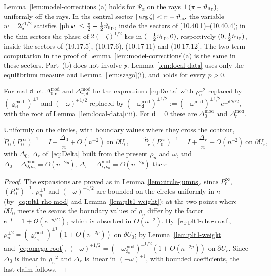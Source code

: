Lemma~\ref{lem:model-corrections}(a) holds for $\Psi_\alpha$ on the rays $\pm(\pi-\vartheta_{\mathrm{lip}})$, uniformly off the rays.
In the central sector $|\arg\zeta|<\pi-\vartheta_{\mathrm{lip}}$ the variable $w=2\zeta^{1/2}$ satisfies
$|\mathrm{ph}\,w|\le\frac\pi2-\frac12\vartheta_{\mathrm{lip}}$, inside the sectors of (10.40.1)--(10.40.4); in the thin sectors the phase of
$2(-\zeta)^{1/2}$ lies in $(-\frac12\vartheta_{\mathrm{lip}},0)$, respectively $(0,\frac12\vartheta_{\mathrm{lip}})$, inside the sectors of (10.17.5),
(10.17.6), (10.17.11) and (10.17.12). The two-term computation in the proof of Lemma~\ref{lem:model-corrections}(a) is
the same in these sectors. Part~(b) does not involve $p$. Lemma~\ref{lem:local-data} uses only the equilibrium measure
and Lemma~\ref{lem:szego}(i), and holds for every $p>0$.

For real $\mathsf d$ let $\Delta^{\mathrm{mod}}_{0,\mathsf d}$ and $\Delta^{\mathrm{mod}}_{r,\mathsf d}$ be the expressions
\eqref{eq:Delta} with $\rho_n^{\pm2}$ replaced by $(\varrho^{\mathrm{mod}}_{\mathsf d})^{\pm1}$ and $(-\omega)^{\pm1/2}$ replaced by
$(-\omega^{\mathrm{mod}}_{\mathsf d})^{\pm1/2}:=(-\omega^{\mathrm{mod}})^{\pm1/2}e^{\pm\mathsf d\mathcal R/2}$, with the root of
Lemma~\ref{lem:local-data}(iii). For $\mathsf d=0$ these are $\Delta^{\mathrm{mod}}_0$ and $\Delta^{\mathrm{mod}}_r$.

\begin{lemma}\label{lem:plt1-jumps}
Uniformly on the circles, with boundary values where they cross the contour,
\[
  \check P_0(P^\infty_0)^{-1}=I+\frac{\Delta_0}n+O(n^{-2})\ \text{on }\partial U_0,\qquad
  \hat P_r(P^\infty_0)^{-1}=I+\frac{\Delta_r}n+O(n^{-2})\ \text{on }\partial U_r,
\]
with $\Delta_0$, $\Delta_r$ of~\eqref{eq:Delta} built from the present $\rho_n$ and $\omega$, and
$\Delta_0-\Delta^{\mathrm{mod}}_{0,\mathsf d_n}=O(n^{-2p})$, $\Delta_r-\Delta^{\mathrm{mod}}_{r,\mathsf d_n}=O(n^{-2p})$ there.
\end{lemma}

\begin{proof}
The expansions are proved as in Lemma~\ref{lem:circle-jumps}, since $P^\infty_0$, $(P^\infty_0)^{-1}$, $\rho_n^{\pm1}$ and
$(-\omega)^{\pm1/2}$ are bounded on the circles uniformly in $n$ (by~\eqref{eq:plt1-rho-mod} and
Lemma~\ref{lem:plt1-weight}); at the two points where $\partial U_0$ meets the seams the boundary values of $\rho_n$
differ by the factor $e^{-\mathfrak j}=1+O(e^{-n/C})$, which is absorbed in $O(n^{-2})$. By~\eqref{eq:plt1-rho-mod},
$\rho_n^{\pm2}=(\varrho^{\mathrm{mod}}_{\mathsf d_n})^{\pm1}(1+O(n^{-2p}))$ on $\partial U_0$; by Lemma~\ref{lem:plt1-weight}
and~\eqref{eq:omega-root}, $(-\omega)^{\pm1/2}=(-\omega^{\mathrm{mod}}_{\mathsf d_n})^{\pm1/2}(1+O(n^{-2p}))$ on
$\partial U_r$. Since $\Delta_0$ is linear in $\rho_n^{\pm2}$ and $\Delta_r$ is linear in $(-\omega)^{\pm1}$, with
bounded coefficients, the last claim follows.
\end{proof}


